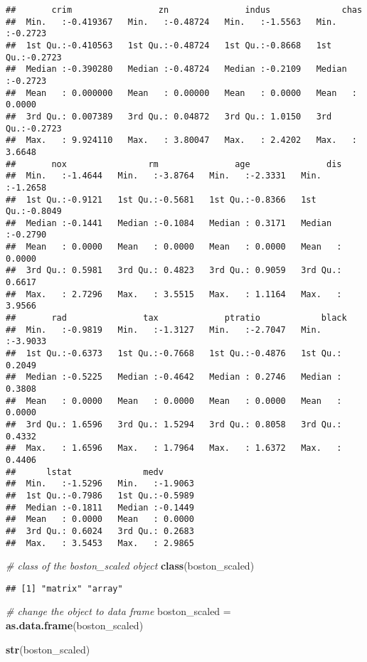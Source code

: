 \documentclass[
]{article}
\newenvironment{Shaded}{\begin{snugshade}}{\end{snugshade}}
\newcommand{\CommentTok}[1]{\textcolor[rgb]{0.56,0.35,0.01}{\textit{#1}}}
\newcommand{\KeywordTok}[1]{\textcolor[rgb]{0.13,0.29,0.53}{\textbf{#1}}}
\newcommand{\NormalTok}[1]{#1}
\newcommand{\StringTok}[1]{\textcolor[rgb]{0.31,0.60,0.02}{#1}}
\begin{document}
\begin{verbatim}
##       crim                 zn               indus              chas        
##  Min.   :-0.419367   Min.   :-0.48724   Min.   :-1.5563   Min.   :-0.2723  
##  1st Qu.:-0.410563   1st Qu.:-0.48724   1st Qu.:-0.8668   1st Qu.:-0.2723  
##  Median :-0.390280   Median :-0.48724   Median :-0.2109   Median :-0.2723  
##  Mean   : 0.000000   Mean   : 0.00000   Mean   : 0.0000   Mean   : 0.0000  
##  3rd Qu.: 0.007389   3rd Qu.: 0.04872   3rd Qu.: 1.0150   3rd Qu.:-0.2723  
##  Max.   : 9.924110   Max.   : 3.80047   Max.   : 2.4202   Max.   : 3.6648  
##       nox                rm               age               dis         
##  Min.   :-1.4644   Min.   :-3.8764   Min.   :-2.3331   Min.   :-1.2658  
##  1st Qu.:-0.9121   1st Qu.:-0.5681   1st Qu.:-0.8366   1st Qu.:-0.8049  
##  Median :-0.1441   Median :-0.1084   Median : 0.3171   Median :-0.2790  
##  Mean   : 0.0000   Mean   : 0.0000   Mean   : 0.0000   Mean   : 0.0000  
##  3rd Qu.: 0.5981   3rd Qu.: 0.4823   3rd Qu.: 0.9059   3rd Qu.: 0.6617  
##  Max.   : 2.7296   Max.   : 3.5515   Max.   : 1.1164   Max.   : 3.9566  
##       rad               tax             ptratio            black        
##  Min.   :-0.9819   Min.   :-1.3127   Min.   :-2.7047   Min.   :-3.9033  
##  1st Qu.:-0.6373   1st Qu.:-0.7668   1st Qu.:-0.4876   1st Qu.: 0.2049  
##  Median :-0.5225   Median :-0.4642   Median : 0.2746   Median : 0.3808  
##  Mean   : 0.0000   Mean   : 0.0000   Mean   : 0.0000   Mean   : 0.0000  
##  3rd Qu.: 1.6596   3rd Qu.: 1.5294   3rd Qu.: 0.8058   3rd Qu.: 0.4332  
##  Max.   : 1.6596   Max.   : 1.7964   Max.   : 1.6372   Max.   : 0.4406  
##      lstat              medv        
##  Min.   :-1.5296   Min.   :-1.9063  
##  1st Qu.:-0.7986   1st Qu.:-0.5989  
##  Median :-0.1811   Median :-0.1449  
##  Mean   : 0.0000   Mean   : 0.0000  
##  3rd Qu.: 0.6024   3rd Qu.: 0.2683  
##  Max.   : 3.5453   Max.   : 2.9865
\end{verbatim}

\begin{Shaded}
\begin{Highlighting}[]
\CommentTok{# class of the boston_scaled object}
\KeywordTok{class}\NormalTok{(boston_scaled)}
\end{Highlighting}
\end{Shaded}

\begin{verbatim}
## [1] "matrix" "array"
\end{verbatim}

\begin{Shaded}
\begin{Highlighting}[]
\CommentTok{# change the object to data frame}
\NormalTok{boston_scaled =}\StringTok{ }\KeywordTok{as.data.frame}\NormalTok{(boston_scaled)}

\KeywordTok{str}\NormalTok{(boston_scaled)}
\end{Highlighting}
\end{Shaded}
\end{document}
